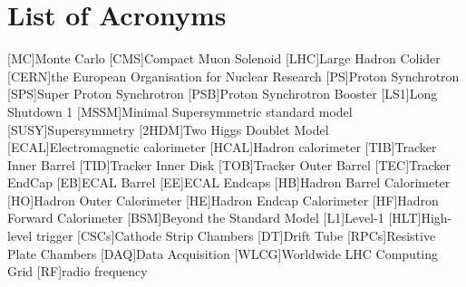 




\chapter*{List of Acronyms}
\begin{acronym}[CERN]
[MC]{Monte Carlo}
[CMS]{Compact Muon Solenoid}
[LHC]{Large Hadron Colider}
[CERN]{the European Organisation for Nuclear Research }
[PS]{Proton Synchrotron}
[SPS]{Super Proton Synchrotron}
[PSB]{Proton Synchrotron Booster}
[LS1]{Long Shutdown 1}
[MSSM]{Minimal Supersymmetric standard model}
[SUSY]{Supersymmetry}
[2HDM]{Two Higgs Doublet Model}
[ECAL]{Electromagnetic calorimeter}
[HCAL]{Hadron calorimeter}
[TIB]{Tracker Inner Barrel}
[TID]{Tracker Inner Disk}
[TOB]{Tracker Outer Barrel}
[TEC]{Tracker EndCap}
[EB]{ECAL Barrel}
[EE]{ECAL Endcaps}
[HB]{Hadron Barrel Calorimeter}
[HO]{Hadron Outer Calorimeter}
[HE]{Hadron Endcap Calorimeter}
[HF]{Hadron Forward Calorimeter}
[BSM]{Beyond the Standard Model}
[L1]{Level-1}
[HLT]{High-level trigger}
[CSCs]{Cathode Strip Chambers}
[DT]{Drift Tube}
[RPCs]{Resistive Plate Chambers}
[DAQ]{Data Acquisition}
[WLCG]{Worldwide LHC Computing Grid}
[RF]{radio frequency}
\end{acronym}


